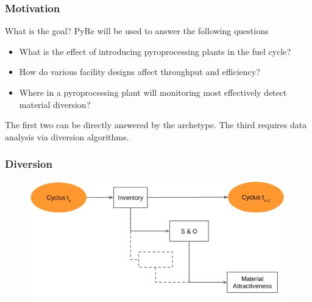 \begin{frame}
  \frametitle{Motivation}
 \begin{block}{What is the goal?}
 	PyRe will be used to answer the following questions
 	\begin{itemize}
 		\item What is the effect of introducing pyroprocessing plants in the fuel cycle?
 		\item How do various facility designs affect throughput and efficiency?
 		\item Where in a pyroprocessing plant will monitoring most 
 		effectively detect material diversion?
 	\end{itemize}
\end{block}
The first two can be directly answered by the archetype. The third requires data analysis via
diversion algorithms.	
\end{frame}

\begin{frame}
  \frametitle{Diversion}
        \begin{figure}
        	\includegraphics[width=0.9\linewidth]{diversion1}
        \end{figure}
\end{frame}
